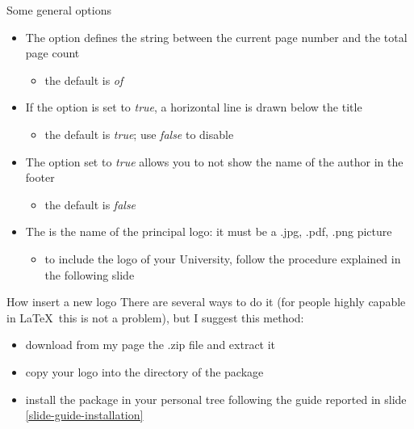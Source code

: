 \begin{tframe}{Some general options}
\begin{itemize}
\item The  option defines the string between the current
      page number and the total page count
  \begin{itemize}
  \item the default is \emph{of}
  \end{itemize}
\item If the  option is set to \emph{true}, a horizontal line
      is drawn below the title
  \begin{itemize}
  \item the default is \emph{true}; use \emph{false} to disable
  \end{itemize}
\item The  option set to \emph{true} allows you to not show the name of the author in the footer
\begin{itemize}
\item the default is \emph{false}
\end{itemize}
\item The  is the name of the principal logo: it must be a .jpg, .pdf, .png picture
\begin{itemize}
\item to include the logo of your University, follow the procedure explained in the following slide
\end{itemize}
\end{itemize}
\end{tframe}

\begin{tframe}{How insert a new logo}
There are several ways to do it (for people highly capable in \LaTeX\, this is not a problem), but I suggest this method:
\begin{itemize}
\item download from my page the .zip file and extract it
\item copy your logo into the directory of the package
\item install the package in your personal tree following the guide reported in slide \ref{slide-guide-installation}
\end{itemize}
\label{slide-rule-installation}
\end{tframe}


